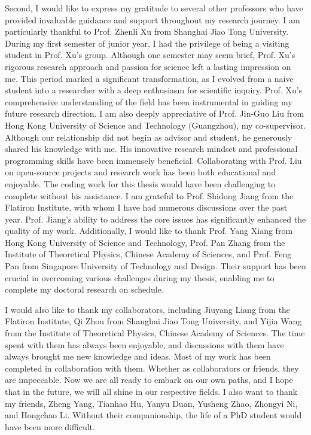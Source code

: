 Second, I would like to express my gratitude to several other professors who have provided invaluable guidance and support throughout my research journey. 
I am particularly thankful to Prof. Zhenli Xu from Shanghai Jiao Tong University. 
During my first semester of junior year, I had the privilege of being a visiting student in Prof. Xu's group.
Although one semester may seem brief, Prof. Xu's rigorous research approach and passion for science left a lasting impression on me. 
This period marked a significant transformation, as I evolved from a naive student into a researcher with a deep enthusiasm for scientific inquiry. Prof. Xu's comprehensive understanding of the field has been instrumental in guiding my future research direction.
I am also deeply appreciative of Prof. Jin-Guo Liu from Hong Kong University of Science and Technology (Guangzhou), my co-supervisor. 
Although our relationship did not begin as advisor and student, he generously shared his knowledge with me. His innovative research mindset and professional programming skills have been immensely beneficial. 
Collaborating with Prof. Liu on open-source projects and research work has been both educational and enjoyable. The coding work for this thesis would have been challenging to complete without his assistance.
I am grateful to Prof. Shidong Jiang from the Flatiron Institute, with whom I have had numerous discussions over the past year. 
Prof. Jiang's ability to address the core issues has significantly enhanced the quality of my work.
Additionally, I would like to thank Prof. Yang Xiang from Hong Kong University of Science and Technology, Prof. Pan Zhang from the Institute of Theoretical Physics, Chinese Academy of Sciences, and Prof. Feng Pan from Singapore University of Technology and Design. 
Their support has been crucial in overcoming various challenges during my thesis, enabling me to complete my doctoral research on schedule.

I would also like to thank my collaborators, including Jiuyang Liang from the Flatiron Institute, Qi Zhou from Shanghai Jiao Tong University, and Yijia Wang from the Institute of Theoretical Physics, Chinese Academy of Sciences. 
The time spent with them has always been enjoyable, and discussions with them have always brought me new knowledge and ideas. 
Most of my work has been completed in collaboration with them. 
Whether as collaborators or friends, they are impeccable. 
Now we are all ready to embark on our own paths, and I hope that in the future, we will all shine in our respective fields.
I also want to thank my friends, Zheng Yang, Tianhao Hu, Yanyu Duan, Yusheng Zhao, Zhongyi Ni, and Hongchao Li. 
Without their companionship, the life of a PhD student would have been more difficult.

